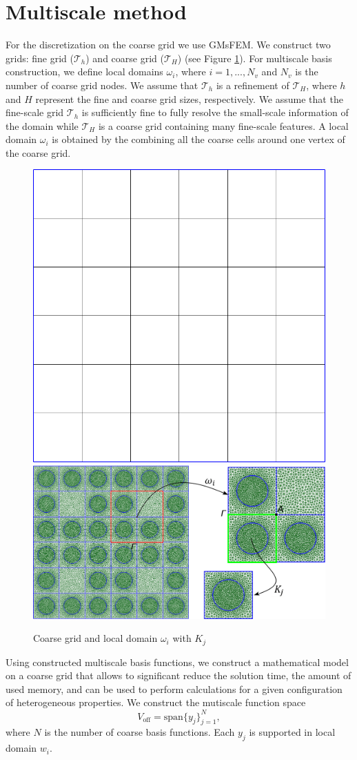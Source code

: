 \documentclass[runningheads]{llncs}
\begin{document}
\section{Multiscale method}
For the discretization on the coarse grid we use GMsFEM.
We construct two grids: fine grid ($\mathcal{T}_h$) and coarse grid ($\mathcal{T}_H$) (see Figure \ref{p1}). 
For multiscale basis construction, we define local domains $\omega_i$, where $i = 1,...,N_v$ and $N_v$ is the number of coarse grid nodes.
We assume that $\mathcal{T}_h$ is a refinement of $\mathcal{T}_H$, where $h$ and $H$ represent the fine and coarse grid sizes, respectively. 
We assume that the fine-scale grid $\mathcal{T}_h$ is sufficiently fine to fully resolve the small-scale information of the domain  while $\mathcal{T}_H$ is a coarse grid containing many fine-scale features.
A local domain $\omega_i$ is obtained by the combining all the coarse cells around one vertex of the coarse grid. 

\begin{figure}[h!]
\centering
\includegraphics[width=0.26\linewidth]{coarse_grid.png}
\hspace{2em}
\includegraphics[width=0.5\linewidth]{omega_GA.png} 
\caption{Coarse grid and local domain $\omega_i$ with $K_j$}
\label{p1}
\end{figure} 

Using constructed multiscale basis functions, we construct a mathematical model on a coarse grid that allows to significant reduce the solution time, the amount of used memory, and can be used to perform calculations for a given configuration of  heterogeneous properties. 
We construct the mutiscale function space
\[
{V}_{\text{off}} = \mbox{span} \{ y_j \}_{j=1}^{N},
\]
where $N$ is the number of coarse basis functions.
Each $y_j$ is supported in local domain $w_i$.
\end{document}
